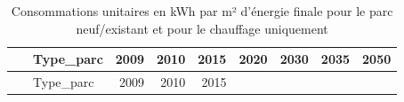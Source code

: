 \documentclass[]{article}
\begin{document}
\begin{longtable}[]{@{}clrrrrrrr@{}}
\caption{Consommations unitaires en kWh par m² d'énergie finale pour le
parc neuf/existant et pour le chauffage uniquement}\tabularnewline
\toprule
\begin{minipage}[b]{0.17\columnwidth}\centering\strut
~\strut
\end{minipage} & \begin{minipage}[b]{0.12\columnwidth}\raggedright\strut
Type\_parc\strut
\end{minipage} & \begin{minipage}[b]{0.07\columnwidth}\raggedleft\strut
2009\strut
\end{minipage} & \begin{minipage}[b]{0.07\columnwidth}\raggedleft\strut
2010\strut
\end{minipage} & \begin{minipage}[b]{0.07\columnwidth}\raggedleft\strut
2015\strut
\end{minipage} & \begin{minipage}[b]{0.07\columnwidth}\raggedleft\strut
2020\strut
\end{minipage} & \begin{minipage}[b]{0.07\columnwidth}\raggedleft\strut
2030\strut
\end{minipage} & \begin{minipage}[b]{0.07\columnwidth}\raggedleft\strut
2035\strut
\end{minipage} & \begin{minipage}[b]{0.07\columnwidth}\raggedleft\strut
2050\strut
\end{minipage}\tabularnewline
\midrule
\endfirsthead
\toprule
\begin{minipage}[b]{0.17\columnwidth}\centering\strut
~\strut
\end{minipage} & \begin{minipage}[b]{0.12\columnwidth}\raggedright\strut
Type\_parc\strut
\end{minipage} & \begin{minipage}[b]{0.07\columnwidth}\raggedleft\strut
2009\strut
\end{minipage} & \begin{minipage}[b]{0.07\columnwidth}\raggedleft\strut
2010\strut
\end{minipage} & \begin{minipage}[b]{0.07\columnwidth}\raggedleft\strut
2015\strut
\end{minipage} & \begin{minipage}[b]{0.07\columnwidth}\raggedleft\strut

\end{minipage}
\end{longtable}
\end{document}
